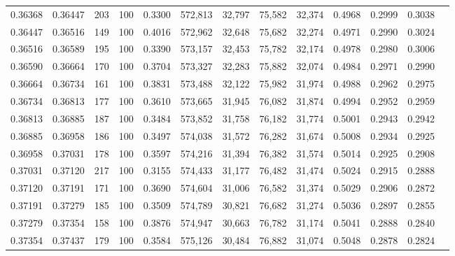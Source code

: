\begin{tabular}{rrrrrrrrrrrrr}
0.36368 & 0.36447 &   203 & 100 &                                     0.3300 & 572,813 &  32,797 &  75,582 &  32,374 & 0.4968 & 0.2999 & 0.3038 \\
0.36447 & 0.36516 &   149 & 100 &                                     0.4016 & 572,962 &  32,648 &  75,682 &  32,274 & 0.4971 & 0.2990 & 0.3024 \\
0.36516 & 0.36589 &   195 & 100 &                                     0.3390 & 573,157 &  32,453 &  75,782 &  32,174 & 0.4978 & 0.2980 & 0.3006 \\
0.36590 & 0.36664 &   170 & 100 &                                     0.3704 & 573,327 &  32,283 &  75,882 &  32,074 & 0.4984 & 0.2971 & 0.2990 \\
0.36664 & 0.36734 &   161 & 100 &                                     0.3831 & 573,488 &  32,122 &  75,982 &  31,974 & 0.4988 & 0.2962 & 0.2975 \\
0.36734 & 0.36813 &   177 & 100 &                                     0.3610 & 573,665 &  31,945 &  76,082 &  31,874 & 0.4994 & 0.2952 & 0.2959 \\
0.36813 & 0.36885 &   187 & 100 &                                     0.3484 & 573,852 &  31,758 &  76,182 &  31,774 & 0.5001 & 0.2943 & 0.2942 \\
0.36885 & 0.36958 &   186 & 100 &                                     0.3497 & 574,038 &  31,572 &  76,282 &  31,674 & 0.5008 & 0.2934 & 0.2925 \\
0.36958 & 0.37031 &   178 & 100 &                                     0.3597 & 574,216 &  31,394 &  76,382 &  31,574 & 0.5014 & 0.2925 & 0.2908 \\
0.37031 & 0.37120 &   217 & 100 &                                     0.3155 & 574,433 &  31,177 &  76,482 &  31,474 & 0.5024 & 0.2915 & 0.2888 \\
0.37120 & 0.37191 &   171 & 100 &                                     0.3690 & 574,604 &  31,006 &  76,582 &  31,374 & 0.5029 & 0.2906 & 0.2872 \\
0.37191 & 0.37279 &   185 & 100 &                                     0.3509 & 574,789 &  30,821 &  76,682 &  31,274 & 0.5036 & 0.2897 & 0.2855 \\
0.37279 & 0.37354 &   158 & 100 &                                     0.3876 & 574,947 &  30,663 &  76,782 &  31,174 & 0.5041 & 0.2888 & 0.2840 \\
0.37354 & 0.37437 &   179 & 100 &                                     0.3584 & 575,126 &  30,484 &  76,882 &  31,074 & 0.5048 & 0.2878 & 0.2824 \\

\end{tabular}
